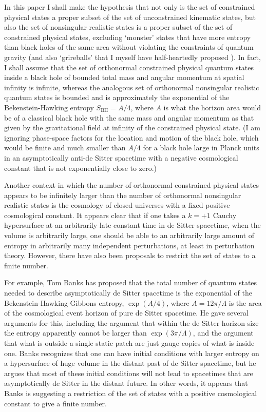 \documentclass[12pt]{article}
\begin{document}
In this paper I shall make the hypothesis that not only is the set of constrained physical states a proper subset of the set of unconstrained kinematic states, but also the set of nonsingular realistic states is a proper subset of the set of constrained physical states, excluding `monster' states that have more entropy than black holes of the same area without violating the constraints of quantum gravity (and also `grireballs' that I myself have half-heartedly proposed \cite{Page:2012zc}).  In fact, I shall assume that the set of orthonormal constrained physical quantum states inside a black hole of bounded total mass and angular momentum at spatial infinity is infinite, whereas the analogous set of orthonormal nonsingular realistic quantum states is bounded and is approximately the exponential of the Bekenstein-Hawking entropy $S_\mathrm{BH} = A/4$, where $A$ is what the horizon area would be of a classical black hole with the same mass and angular momentum as that given by the gravitational field at infinity of the constrained physical state.  (I am ignoring phase-space factors for the location and motion of the black hole, which would be finite and much smaller than $A/4$ for a black hole large in Planck units in an asymptotically anti-de Sitter spacetime with a negative cosmological constant that is not exponentially close to zero.)

Another context in which the number of orthonormal constrained physical states appears to be infinitely larger than the number of orthonormal nonsingular realistic states is the cosmology of closed universes with a fixed positive cosmological constant.  It appears clear that if one takes a $k=+1$ Cauchy hypersurface at an arbitrarily late constant time in de Sitter spacetime, when the volume is arbitrarily large, one should be able to an arbitrarily large amount of entropy in arbitrarily many independent perturbations, at least in perturbation theory.  However, there have also been proposals to restrict the set of states to a finite number.

For example, Tom Banks \cite{Banks:2000fe} has proposed that the total number of quantum states needed to describe asymptotically de Sitter spacetime is the exponential of the Bekenstein-Hawking-Gibbons entropy, $\exp{(A/4)}$, where $A = 12\pi/\Lambda$ is the area of the cosmological event horizon of pure de Sitter spacetime.  He gave several arguments for this, including the argument that within the de Sitter horizon size the entropy apparently cannot be larger than $\exp{(3\pi/\Lambda)}$, and the argument that what is outside a single static patch are just gauge copies of what is inside one.  Banks recognizes that one can have initial conditions with larger entropy on a hypersurface of huge volume in the distant past of de Sitter spacetime, but he argues that most of these initial conditions will not lead to spacetimes that are asymptotically de Sitter in the distant future.  In other words, it appears that Banks is suggesting a restriction of the set of states with a positive cosmological constant to give a finite number.
\end{document}
